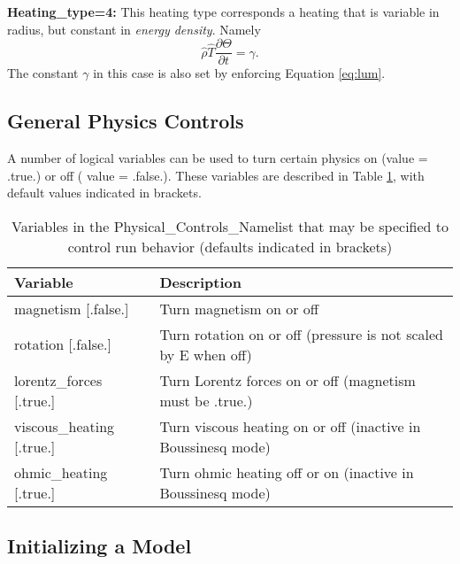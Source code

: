 \textbf{Heating\_type=4:}
This heating type corresponds a heating that is variable in radius, but constant in \textit{energy density}.  Namely
\begin{equation}
\hat{\rho}\hat{T}\frac{\partial \Theta}{\partial t}=\gamma.
\end{equation}
The constant $\gamma$ in this case is also set by enforcing Equation \ref{eq:lum}.

\subsection{General Physics Controls}
A number of logical variables can be used to turn certain physics on (value = .true.) or off ( value = .false.).  These variables are described in Table \ref{table:logicals}, with default values indicated in brackets. 
\begin{table}
\centering
\begin{tabular}{| l | l |}
\hline
Variable & Description \\
\hline
magnetism        [.false.]          & Turn magnetism on or off \\
rotation         [.false.]           & Turn rotation on or off (pressure is not scaled by E when off) \\
lorentz\_forces  [.true.]     & Turn Lorentz forces on or off (magnetism must be .true.) \\
viscous\_heating [.true.]    & Turn viscous heating on or off (inactive in Boussinesq mode) \\
ohmic\_heating   [.true.]      & Turn ohmic heating off or on (inactive in Boussinesq mode) \\
\hline
\end{tabular}
\caption{\label{table:logicals} Variables in the Physical\_Controls\_Namelist that may be specified to control run behavior (defaults indicated in brackets)}
\end{table}

\subsection{Initializing a Model}

